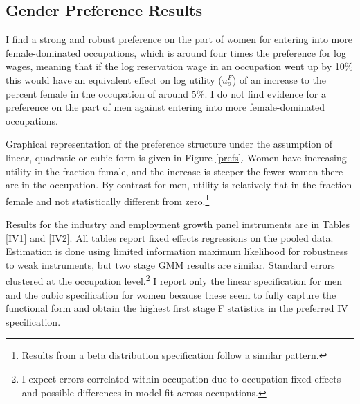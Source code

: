 \documentclass[12pt]{article}
\begin{document}



\subsection{Gender Preference Results}
I find a strong and robust preference on the part of women for entering into more female-dominated occupations, which is around four times the preference for log wages, meaning that if the log reservation wage in an occupation went up by 10\% this would have an equivalent effect on log utility ($\bar{u}^F_o$) of an increase to the percent female in the occupation of around 5\%. I do not find evidence for a preference on the part of men against entering into more female-dominated occupations.


Graphical representation of the preference structure under the assumption of linear, quadratic or cubic form is given in Figure \ref{prefs}. Women have increasing utility in the fraction female, and the increase is steeper the fewer women there are in the occupation. By contrast for men, utility is relatively flat in the fraction female and not statistically different from zero.\footnote{Results from a beta distribution specification follow a similar pattern.}

Results for the industry and employment growth panel instruments are in Tables \ref{IV1} and \ref{IV2}. All tables report fixed effects regressions on the pooled data. Estimation is done using limited information maximum likelihood for robustness to weak instruments, but two stage GMM results are similar. Standard errors clustered at the occupation level.\footnote{I expect errors correlated within occupation due to occupation fixed effects and possible differences in model fit across occupations.} I report only the linear specification for men and the cubic specification for women because these seem to fully capture the functional form and obtain the highest first stage F statistics in the preferred IV specification.
\end{document}
